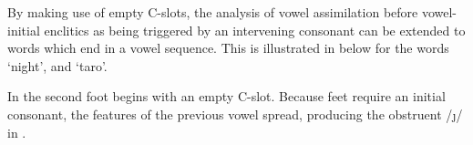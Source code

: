 \begin{exe}
\end{exe}

By making use of empty C-slots,
the analysis of vowel assimilation before vowel-initial enclitics
as being triggered by an intervening consonant can be extended
to words which end in a vowel sequence.
This is illustrated in  below
for the words  {\ra}  `night',
and  {\ra}  `taro'.

In  the second foot begins with an empty C-slot.
Because feet require an initial consonant,
the features of the previous vowel spread,
producing the obstruent /\j/ in .

